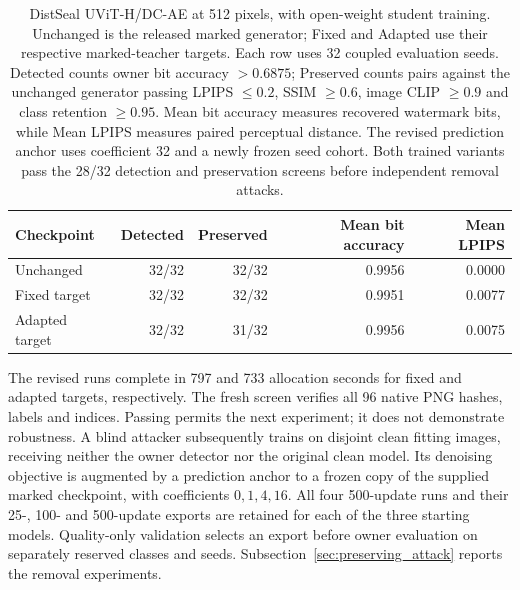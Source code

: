 \begin{table}[ht]\centering\small
\begin{tabular}{lrrrr}\toprule
Checkpoint & Detected & Preserved & Mean bit accuracy & Mean LPIPS\\\midrule
Unchanged & 32/32 & 32/32 & 0.9956 & 0.0000\\
Fixed target & 32/32 & 32/32 & 0.9951 & 0.0077\\
Adapted target & 32/32 & 31/32 & 0.9956 & 0.0075\\\bottomrule
\end{tabular}
\caption{DistSeal UViT-H/DC-AE at 512 pixels, with open-weight student training. Unchanged is the released marked generator; Fixed and Adapted use their respective marked-teacher targets. Each row uses 32 coupled evaluation seeds. Detected counts owner bit accuracy $>0.6875$; Preserved counts pairs against the unchanged generator passing LPIPS $\leq0.2$, SSIM $\geq0.6$, image CLIP $\geq0.9$ and class retention $\geq0.95$. Mean bit accuracy measures recovered watermark bits, while Mean LPIPS measures paired perceptual distance. The revised prediction anchor uses coefficient 32 and a newly frozen seed cohort. Both trained variants pass the 28/32 detection and preservation screens before independent removal attacks.}
\end{table}

The revised runs complete in 797 and 733 allocation seconds for fixed and adapted targets, respectively. The fresh screen verifies all 96 native PNG hashes, labels and indices. Passing permits the next experiment; it does not demonstrate robustness. A blind attacker subsequently trains on disjoint clean fitting images, receiving neither the owner detector nor the original clean model. Its denoising objective is augmented by a prediction anchor to a frozen copy of the supplied marked checkpoint, with coefficients $0,1,4,16$. All four 500-update runs and their 25-, 100- and 500-update exports are retained for each of the three starting models. Quality-only validation selects an export before owner evaluation on separately reserved classes and seeds. Subsection~\ref{sec:preserving_attack} reports the removal experiments.

